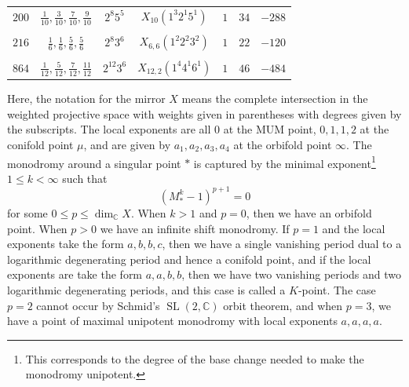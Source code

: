 \documentclass[10pt]{amsart}
\theoremstyle{definition}
\theoremstyle{remark}
\theoremstyle{plain}
\theoremstyle{definition}
\theoremstyle{remark}
\newcommand{\C}{\mathbb{C}}
\newcommand{\on}[1]{\operatorname{#1}}
\newcommand{\1}{\mathbf{1}}
\newcommand{\2}{\mathbf{2}}
\newcommand{\3}{\mathbf{3}}
\begin{document}
\begin{table}[htpb]
\begin{tabular}{ccccccc}
        \\[-0.8em]
        $200$ & $\frac{1}{10},\frac{3}{10},\frac{7}{10},\frac{9}{10}$ & $2^{8}5^5$ & $X_{10}(1^3 2^1 5^1)$ & $1$ & $34$ & $-288$ \\
        \\[-0.8em]
        $216$ & $\frac{1}{6},\frac{1}{6},\frac{5}{6},\frac{5}{6}$ & $2^{8}3^6$ & $X_{6,6}(1^2 2^2 3^2)$ & $1$ & $22$ & $-120$ \\
        \\[-0.8em]
        $864$ & $\frac{1}{12},\frac{5}{12},\frac{7}{12},\frac{11}{12}$ & $2^{12}3^6$ & $X_{12,2}(1^4 4^1 6^1)$ & $1$ & $46$ & $-484$ \\
        \bottomrule
    \end{tabular}
\end{table}
Here, the notation for the mirror $X$ means the complete intersection in the weighted projective space with weights given in parentheses with degrees given by the subscripts. The local exponents are all $0$ at the MUM point, $0,1,1,2$ at the conifold point $\mu$, and are given by $a_1, a_2, a_3, a_4$ at the orbifold point $\infty$. The monodromy around a singular point $*$ is captured by the minimal exponent\footnote{This corresponds to the degree of the base change needed to make the monodromy unipotent.} $1 \leq k < \infty$ such that
\[ (M_*^k-1)^{p+1} = 0 \]
for some $0 \leq p \leq \dim_{\C} X$. When $k > 1$ and $p=0$, then we have an orbifold point. When $p > 0$ we have an infinite shift monodromy. If $p=1$ and the local exponents take the form $a,b,b,c$, then we have a single vanishing period dual to a logarithmic degenerating period and hence a conifold point, and if the local exponents are take the form $a,a,b,b$, then we have two vanishing periods and two logarithmic degenerating periods, and this case is called a $K$-point. The case $p=2$ cannot occur by Schmid's $\on{SL}(2,\C)$ orbit theorem, and when $p=3$, we have a point of maximal unipotent monodromy with local exponents $a,a,a,a$.
\end{document}

